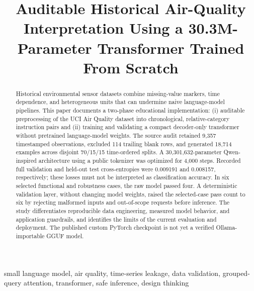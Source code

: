 \documentclass[conference,a4paper,10pt]{IEEEtran}
\begin{document}
\title{Auditable Historical Air-Quality Interpretation Using a 30.3M-Parameter Transformer Trained From Scratch}
\author{
}
\maketitle
\begin{abstract}
Historical environmental sensor datasets combine missing-value markers, time dependence, and heterogeneous units that can undermine naive language-model pipelines. This paper documents a two-phase educational implementation: (i) auditable preprocessing of the UCI Air Quality dataset into chronological, relative-category instruction pairs and (ii) training and validating a compact decoder-only transformer without pretrained language-model weights. The source audit retained 9,357 timestamped observations, excluded 114 trailing blank rows, and generated 18,714 examples across disjoint 70/15/15 time-ordered splits. A 30,301,632-parameter Qwen-inspired architecture using a public tokenizer was optimized for 4,000 steps. Recorded full validation and held-out test cross-entropies were 0.009191 and 0.008157, respectively; these losses must not be interpreted as classification accuracy. In six selected functional and robustness cases, the raw model passed four. A deterministic validation layer, without changing model weights, raised the selected-case pass count to six by rejecting malformed inputs and out-of-scope requests before inference. The study differentiates reproducible data engineering, measured model behavior, and application guardrails, and identifies the limits of the current evaluation and deployment. The published custom PyTorch checkpoint is not yet a verified Ollama-importable GGUF model.
\end{abstract}
\begin{IEEEkeywords}
small language model, air quality, time-series leakage, data validation, grouped-query attention, transformer, safe inference, design thinking
\end{IEEEkeywords}
\end{document}
